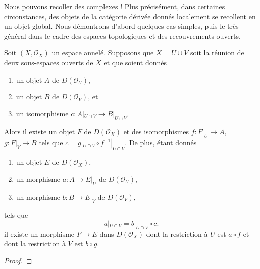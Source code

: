 {\label{section-glueing-complexes}

\noindent
Nous pouvons recoller des complexes ! Plus précisément, dans certaines circonstances, des objets de la catégorie dérivée donnés localement se recollent en un objet global. Nous démontrons d'abord quelques cas simples, puis le très général \cite[théorème 3.2.4]{BBD} dans le cadre des espaces topologiques et des recouvrements ouverts.

\begin{lemma}

\label{lemma-glue}

Soit $(X, \mathcal{O}_X)$ un espace annelé. Supposons que $X = U \cup V$ soit la réunion de deux sous-espaces ouverts de $X$ et que soient donnés

\begin{enumerate}

\item un objet $A$ de $D(\mathcal{O}_U)$,
\item un objet $B$ de $D(\mathcal{O}_V)$, et
\item un isomorphisme $c : A|_{U \cap V} \to B|_{U \cap V}$.

\end{enumerate}

Alors il existe un objet $F$ de $D(\mathcal{O}_X)$
et des isomorphismes $f : F|_U \to A$, $g : F|_V \to B$ tels que $c = g|_{U \cap V} \circ f^{-1}|_{U \cap V}$. De plus, étant donnés

\begin{enumerate}

\item un objet $E$ de $D(\mathcal{O}_X)$,
\item un morphisme $a : A \to E|_U$ de $D(\mathcal{O}_U)$,
\item un morphisme $b : B \to E|_V$ de $D(\mathcal{O}_V)$, 

\end{enumerate}

tels que
$$
a|_{U \cap V}  = b|_{U \cap V} \circ c.
$$
il existe un morphisme $F \to E$ dans $D(\mathcal{O}_X)$
dont la restriction à $U$ est $a \circ f$
et dont la restriction à $V$ est $b \circ g$.

\end{lemma}

\begin{proof}


\end{proof}}
